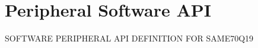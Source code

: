 \hypertarget{group__SAME70Q19__api}{}\section{Peripheral Software A\+PI}
\label{group__SAME70Q19__api}
S\+O\+F\+T\+W\+A\+RE P\+E\+R\+I\+P\+H\+E\+R\+AL A\+PI D\+E\+F\+I\+N\+I\+T\+I\+ON F\+OR S\+A\+M\+E70\+Q19 